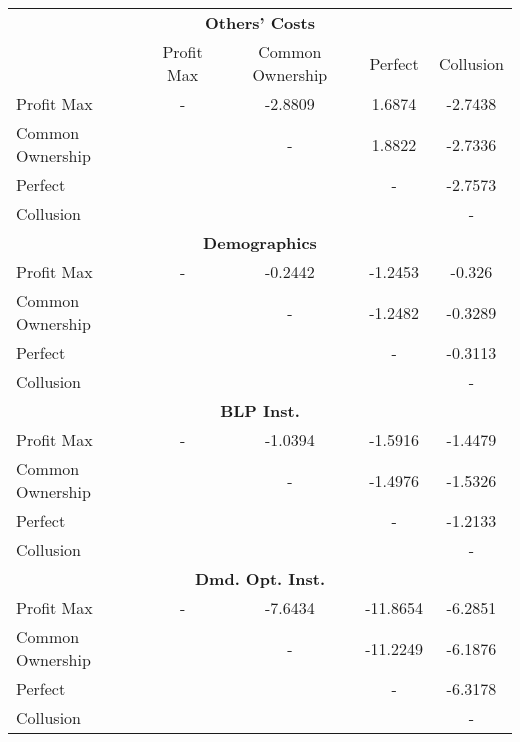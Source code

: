 \begin{tabular}{lcccc}
\toprule
                  \multicolumn{5}{c}{\textbf{Others' Costs}} \\ & Profit Max & Common Ownership & Perfect & Collusion \\
\midrule
       Profit Max &          - &          -2.8809 &  1.6874 &   -2.7438 \\
 Common Ownership &            &                - &  1.8822 &   -2.7336 \\
          Perfect &            &                  &       - &   -2.7573 \\
        Collusion &            &                  &         &         - \\
\midrule

 \multicolumn{5}{c}{\textbf{Demographics}} \\ \midrule
       Profit Max &          - &          -0.2442 & -1.2453 &    -0.326 \\
 Common Ownership &            &                - & -1.2482 &   -0.3289 \\
          Perfect &            &                  &       - &   -0.3113 \\
        Collusion &            &                  &         &         - \\
\midrule

 \multicolumn{5}{c}{\textbf{BLP Inst.}} \\ \midrule
       Profit Max &          - &          -1.0394 & -1.5916 &   -1.4479 \\
 Common Ownership &            &                - & -1.4976 &   -1.5326 \\
          Perfect &            &                  &       - &   -1.2133 \\
        Collusion &            &                  &         &         - \\
\midrule

 \multicolumn{5}{c}{\textbf{Dmd. Opt. Inst.}} \\ \midrule
       Profit Max &          - &          -7.6434 & -11.8654 &   -6.2851 \\
 Common Ownership &            &                - & -11.2249 &   -6.1876 \\
          Perfect &            &                  &        - &   -6.3178 \\
        Collusion &            &                  &          &         - \\
\bottomrule
\end{tabular}
 